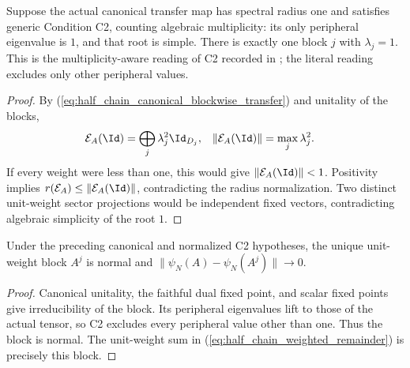 \begin{lemma}
    \label{lem:half_chain_c2_dominant_sector}
    \leanok
    Suppose the actual canonical transfer map has spectral radius one
    and satisfies generic Condition C2, counting algebraic multiplicity:
    its only peripheral eigenvalue is $1$, and that root is simple.
    There is exactly one block $j$ with $\lambda_j=1$.
    This is the multiplicity-aware reading of C2 recorded in
    \cite{gap:pgvwc07_half_chain_spectrum_conventions}; the literal reading
    excludes only other peripheral values.
\end{lemma}
\begin{proof}\leanok
    By (\ref{eq:half_chain_canonical_blockwise_transfer}) and unitality
    of the blocks,
    \begin{align}
        \mathcal E_A(\Id)
         & =\bigoplus_j\lambda_j^2\Id_{D_j},
         & \|\mathcal E_A(\Id)\|
         & =\max_j\lambda_j^2.
        \label{eq:half_chain_canonical_identity_transfer}
    \end{align}
    If every weight were less than one, this would give
    $\|\mathcal E_A(\Id)\|<1$. Positivity implies
    $r(\mathcal E_A)\leq\|\mathcal E_A(\Id)\|$, contradicting the
    radius normalization. Two distinct unit-weight sector projections
    would be independent fixed vectors, contradicting algebraic
    simplicity of the root $1$.
\end{proof}

\begin{lemma}
    \label{lem:half_chain_c2_dominant_physical_limit}
    \leanok
    Under the preceding canonical and normalized C2 hypotheses, the
    unique unit-weight block $A^j$ is normal and
    $\|\psi_N(A)-\psi_N(A^j)\|\to0$.
\end{lemma}
\begin{proof}\leanok
    Canonical unitality, the faithful dual fixed point, and scalar fixed
    points give irreducibility of the block. Its peripheral eigenvalues
    lift to those of the actual tensor, so C2 excludes every peripheral
    value other than one. Thus the block is normal. The unit-weight sum
    in (\ref{eq:half_chain_weighted_remainder}) is precisely this block.
\end{proof}

